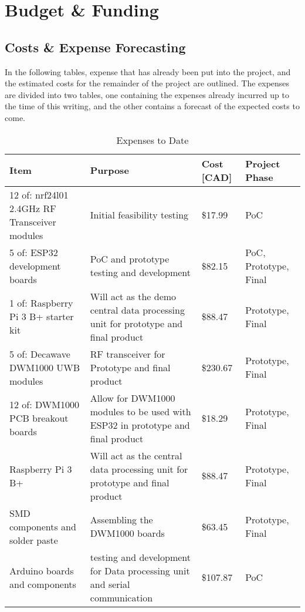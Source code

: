 \setcounter{section}{3}
\section{Budget \& Funding}
\bigskip

\subsection{Costs \& Expense Forecasting}
In the following tables, expense that has already been put into the project, and the estimated costs for the remainder of the project are outlined.  The expenses are divided into two tables, one containing the expenses already incurred up to the time of this writing, and the other contains a forecast of the expected costs to come.


\begin{table}[H]
\centering
\begin{tabular}{ | m{4.75cm} | m{5cm} | m{2.5cm} | m{3cm} |}
\hline
\textbf{Item} & \textbf{Purpose} & \textbf{Cost [CAD]} & \textbf{Project Phase}  \\
\hline
12 of: nrf24l01 2.4GHz RF Transceiver modules & Initial feasibility testing & \$17.99 & PoC \\
\hline
5 of: ESP32 development boards & PoC and prototype testing and development & \$82.15 & PoC, Prototype, Final \\
\hline
1 of: Raspberry Pi 3 B+ starter kit & Will act as the demo central data processing unit for prototype and final product & \$88.47 & Prototype, Final \\
\hline
5 of: Decawave DWM1000 UWB modules & RF transceiver for Prototype and final product & \$230.67 & Prototype, Final \\
\hline
12 of: DWM1000 PCB breakout boards & Allow for DWM1000 modules to be used with ESP32 in prototype and final product & \$18.29 & Prototype, Final \\
\hline
Raspberry Pi 3 B+ & Will act as the central data processing unit for prototype and final product & \$88.47 & Prototype, Final \\
\hline
SMD components and solder paste & Assembling the DWM1000 boards & \$63.45 & Prototype, Final\\
\hline
Arduino boards and components & testing and development for Data processing unit and serial communication & \$107.87 & PoC \\
\hline
\end{tabular}
\caption{Expenses to Date}
\end{table}

